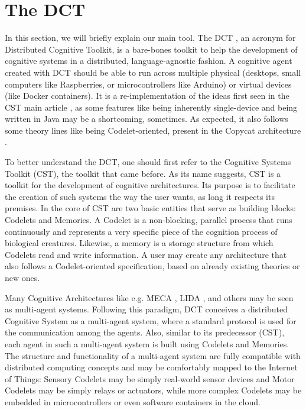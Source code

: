\section{The DCT}
\label{sec:sec2}

In this section, we will briefly explain our main tool. The DCT \citep{gibaut2020extending}, an acronym for Distributed Cognitive Toolkit, is a bare-bones toolkit to help the development of cognitive systems in a distributed, language-agnostic fashion. A cognitive agent created with DCT should be able to run across multiple physical (desktops, small computers like Raspberries, or microcontrollers like Arduino) or virtual devices (like Docker containers). It is a re-implementation of the ideas first seen in the CST main article \citep{Paraense201632}, as some features like being inherently single-device and being written in Java may be a shortcoming, sometimes. As expected, it also follows some theory lines like being Codelet-oriented, present in the Copycat architecture \citep{hofstadter1994copycat}. 

To better understand the DCT, one should first refer to the Cognitive Systems Toolkit (CST), the toolkit that came before. As its name suggests, CST is a toolkit for the development of cognitive architectures. Its purpose is to facilitate the creation of such systems the way the user wants, as long it respects its premises. In the core of CST are two basic entities that serve as building blocks: Codelets and Memories. A Codelet is a non-blocking, parallel process that runs continuously and represents a very specific piece of the cognition process of biological creatures. Likewise, a memory is a storage structure from which Codelets read and write information. A user may create any architecture that also follows a Codelet-oriented specification, based on already existing theories or new ones.

Many Cognitive Architectures like e.g. MECA \citep{gudwin2017multipurpose}, LIDA \citep{franklin2014lida}, and others may be seen as multi-agent systems. Following this paradigm, DCT conceives a distributed Cognitive System as a multi-agent system, where a standard protocol is used for the communication among the agents. Also, similar to its predecessor (CST), each agent in such a multi-agent system is built using Codelets and Memories.  The structure and functionality of a multi-agent system are fully compatible with distributed computing concepts and may be comfortably mapped to the Internet of Things: Sensory Codelets may be simply real-world sensor devices and Motor Codelets may be simply relays or actuators, while more complex Codelets may be embedded in microcontrollers or even software containers in the cloud. 


